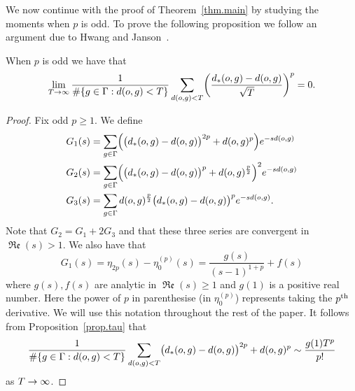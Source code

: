 \documentclass[AHL,Unicode,longabstracts,published]{cedram}
\newcommand{\G}{\Gamma}
\DeclareMathOperator{\fkRe}{\mathfrak{Re}}
\let\originalleft\left
\let\originalright\right
\renewcommand{\left}{\mathopen{}\mathclose\bgroup\originalleft}
\renewcommand{\right}{\aftergroup\egroup\originalright}
\renewcommand*{\to}{\mathchoice{\longrightarrow}{\rightarrow}{\rightarrow}{\rightarrow}}
\theoremstyle{plain}
\newcommand{\G}{\Gamma}
\begin{document}
We now continue with the proof of Theorem~\ref{thm.main} by studying the moments when $p$ is odd. To prove the following proposition we follow an argument due to Hwang and Janson~\cite{hwang.janson}.
\begin{prop}
When $p$ is odd we have that
\[
\lim_{T\to\infty} \frac{1}{\#\left\{ g\in\G: d(o,g) < T\right\}} \sum_{d(o,g) < T} \left(\frac{d_\ast(o,g) - d(o,g)}{\sqrt{T}} \right)^p = 0.
\]
\end{prop}

\begin{proof}
Fix odd $p \ge 1$. We define
\begin{align*}
&G_1(s) = \sum_{g\in\G} \left(\bigl(d_\ast(o,g) - d(o,g)\bigr)^{2p} + d(o,g)^p\right) e^{-sd(o,g)}\\
&G_2(s) = \sum_{g\in\G} \left(\bigl(d_\ast(o,g) - d(o,g)\bigr)^p + d(o,g)^{\frac{p}{2}} \right)^2 e^{-sd(o,g)}\\
&G_3(s) = \sum_{g\in\G} d(o,g)^{\frac{p}{2}} \bigl(d_\ast(o,g) - d(o,g)\bigr)^p e^{-sd(o,g)}.
\end{align*}
Note that $G_2 = G_1 + 2G_3$ and that these three series are convergent in $\fkRe(s) > 1$. We also have that
\[
G_1(s) = \eta_{2p}(s) - \eta_0^{(p)}(s) = \frac{g(s)}{(s-1)^{1+p}} + f(s)
\]
where $g(s), f(s)$ are analytic in $\fkRe(s) \ge 1$ and $g(1)$ is a positive real number. Here the power of $p$ in parenthesise (in $\eta_0^{(p)}$) represents taking the $p^{\rm th}$ derivative. We will use this notation throughout the rest of the paper. It follows from Proposition~\ref{prop.tau} that
\[
\frac{1}{\#\left\{g\in\G: d(o,g) <T\right\}} \sum_{d(o,g) <T} \bigl(d_\ast(o,g) - d(o,g)\bigr)^{2p} + d(o,g)^p \sim \frac{g(1)T^p}{p!}
\]
as $T\to\infty$.


\end{proof}
\end{document}
